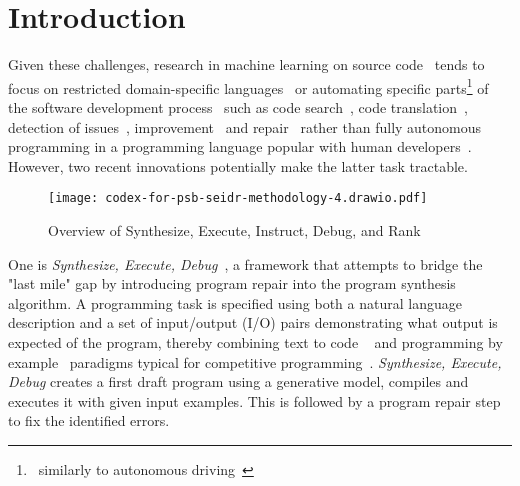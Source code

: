 
\section{Introduction}
\label{sec:seidr-intro}





Given these challenges, research in machine learning on source code~\cite{allamanis2018:survey} tends to focus on restricted domain-specific languages~\cite{chen2021:latent,flashmeta,liventsev2021:bf} or automating specific parts\footnote{~similarly to autonomous driving~\cite{grigorescu2020:survey,marcano2020:review}} of the software development process~\cite{lu2021:codexglue,niu2023:crosscodebench} such as code search~\cite{husain2020:codesearchnet}, code translation~\cite{roziere2020:unsupervised}, detection of issues~\cite{fernandes2016:reviewbased,chakraborty2021:deep}, improvement~\cite{petke2018:genetic} and repair~\cite{gouesAutomatedProgramRepair2019} rather than fully autonomous programming in a programming language popular with human developers~\cite{:tiobe}.
However, two recent innovations potentially make the latter task tractable.

\begin{figure*}
    \centering
    \texttt{[image: codex-for-psb-seidr-methodology-4.drawio.pdf]}
    \caption{Overview of Synthesize, Execute, Instruct, Debug, and Rank}
    \label{fig:method}
\end{figure*}

One is \emph{Synthesize, Execute, Debug}~\cite{guptaSynthesizeExecuteDebug2020}, a framework that attempts to bridge the "last mile" gap by introducing program repair into the program synthesis algorithm. 
A programming task is specified using both a natural language description and a set of input/output (I/O) pairs demonstrating what output is expected of the program, thereby combining text to code ~\cite{iyer2018:mapping} and programming by example~\cite{halbertProgrammingExample1984,gulwani2016:programming} paradigms typical for competitive programming~\cite{zavershynskyi2018:naps}.
\emph{Synthesize, Execute, Debug} creates a first draft program using a generative model, compiles and executes it with given input examples.
This is followed by a program repair step to fix the identified errors.

